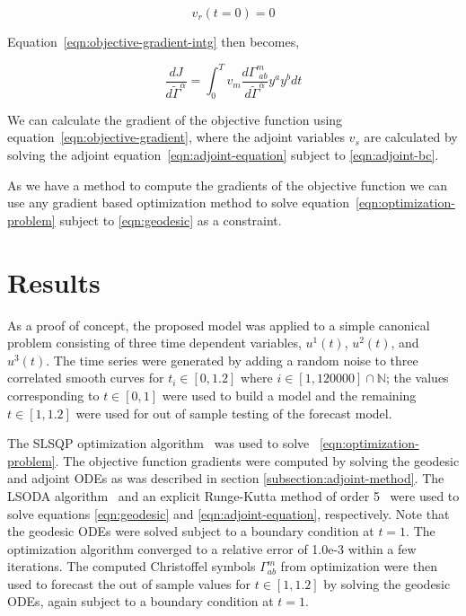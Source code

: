 \documentclass[a4paper,11pt]{elsarticle}
\begin{document}
\begin{equation}\label{eqn:adjoint-bc}
v_{r}( t = 0 ) = 0  
\end{equation}

Equation~\ref{eqn:objective-gradient-intg} then becomes,

\begin{equation}\label{eqn:objective-gradient}
\frac{d J}{d \tilde{\Gamma}^{\alpha}} = \int_{0}^{T} v_{m} \frac{d
  \Gamma^{m}_{\;ab}}{d \tilde{\Gamma}^{\alpha}} y^{a} y^{b} dt
\end{equation}

We can calculate the gradient of the objective function using
equation~\ref{eqn:objective-gradient}, where the adjoint variables
$v_{s}$ are calculated by solving the adjoint
equation~\ref{eqn:adjoint-equation} subject to \ref{eqn:adjoint-bc}.

As we have a method to compute the gradients of the objective function
we can use any gradient based optimization method to solve
equation~\ref{eqn:optimization-problem} subject to \ref{eqn:geodesic}
as a constraint.

\section{Results}\label{section:results}

As a proof of concept, the proposed model was applied to a simple
canonical problem consisting of three time dependent variables,
$u^{1}(t)$, $u^{2}(t)$, and $u^{3}(t)$. The time series were generated
by adding a random noise to three correlated smooth curves for $t_{i}
\in [0,1.2]$ where $i \in [1,120000] \cap \mathbb{N}$; the values
corresponding to $t \in [0,1]$ were used to build a model and the
remaining $t \in [1,1.2]$ were used for out of sample testing of the
forecast model.

The SLSQP optimization algorithm~\cite{numerical-optimization-2006}
was used to solve ~\ref{eqn:optimization-problem}. The objective
function gradients were computed by solving the geodesic and adjoint
ODEs as was described in section \ref{subsection:adjoint-method}. The
LSODA algorithm~\cite{petzold-1983} and an explicit Runge-Kutta method
of order 5~\cite{dormand-prince-1980} were used to solve equations
\ref{eqn:geodesic} and \ref{eqn:adjoint-equation}, respectively. Note
that the geodesic ODEs were solved subject to a boundary condition at
$t = 1$. The optimization algorithm converged to a relative error of
1.0e-3 within a few iterations. The computed Christoffel symbols
$\Gamma^{m}_{ab}$ from optimization were then used to forecast the out
of sample values for $t \in [1,1.2]$ by solving the geodesic ODEs,
again subject to a boundary condition at $t = 1$.
\end{document}

